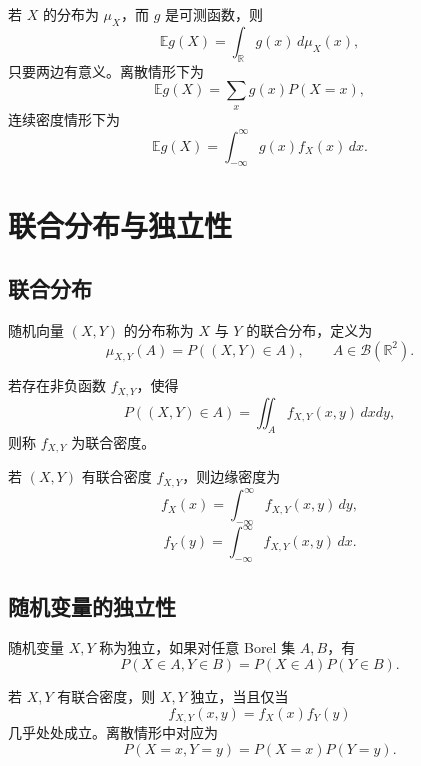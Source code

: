 \begin{theorem}[无意识统计学家定律]
若 $X$ 的分布为 $\mu_X$，而 $g$ 是可测函数，则
\[
    \mathbb{E}g(X)=\int_{\mathbb{R}} g(x)\,d\mu_X(x),
\]
只要两边有意义。离散情形下为
\[
    \mathbb{E}g(X)=\sum_x g(x)P(X=x),
\]
连续密度情形下为
\[
    \mathbb{E}g(X)=\int_{-\infty}^{\infty}g(x)f_X(x)\,dx.
\]
\end{theorem}

\section{联合分布与独立性}

\subsection{联合分布}

\begin{definition}[联合分布]
随机向量 $(X,Y)$ 的分布称为 $X$ 与 $Y$ 的联合分布，定义为
\[
    \mu_{X,Y}(A)=P((X,Y)\in A),
    \qquad A\in\mathcal{B}(\mathbb{R}^2).
\]
\end{definition}

\begin{definition}[联合密度]
若存在非负函数 $f_{X,Y}$，使得
\[
    P((X,Y)\in A)=\iint_A f_{X,Y}(x,y)\,dxdy,
\]
则称 $f_{X,Y}$ 为联合密度。
\end{definition}

\begin{definition}[边缘密度]
若 $(X,Y)$ 有联合密度 $f_{X,Y}$，则边缘密度为
\[
    f_X(x)=\int_{-\infty}^{\infty}f_{X,Y}(x,y)\,dy,
\]
\[
    f_Y(y)=\int_{-\infty}^{\infty}f_{X,Y}(x,y)\,dx.
\]
\end{definition}

\subsection{随机变量的独立性}

\begin{definition}[随机变量独立]
随机变量 $X,Y$ 称为独立，如果对任意 Borel 集 $A,B$，有
\[
    P(X\in A,Y\in B)=P(X\in A)P(Y\in B).
\]
\end{definition}

\begin{proposition}[分解判别法]
若 $X,Y$ 有联合密度，则 $X,Y$ 独立，当且仅当
\[
    f_{X,Y}(x,y)=f_X(x)f_Y(y)
\]
几乎处处成立。离散情形中对应为
\[
    P(X=x,Y=y)=P(X=x)P(Y=y).
\]
\end{proposition}

